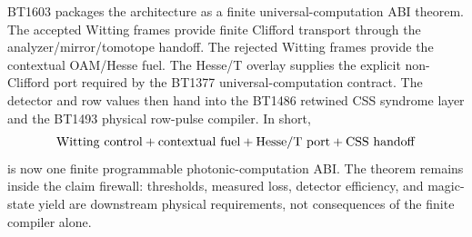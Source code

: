 BT1603 packages the architecture as a finite universal-computation ABI theorem.
The accepted Witting frames provide finite Clifford transport through the
analyzer/mirror/tomotope handoff.  The rejected Witting frames provide the
contextual OAM/Hesse fuel.  The Hesse/T overlay supplies the explicit
non-Clifford port required by the BT1377 universal-computation contract.  The
detector and row values then hand into the BT1486 retwined CSS syndrome layer
and the BT1493 physical row-pulse compiler.  In short,
\[
  {\rm Witting\ control}
  +{\rm contextual\ fuel}
  +{\rm Hesse/T\ port}
  +{\rm CSS\ handoff}
\]
is now one finite programmable photonic-computation ABI.  The theorem remains
inside the claim firewall: thresholds, measured loss, detector efficiency, and
magic-state yield are downstream physical requirements, not consequences of the
finite compiler alone.
